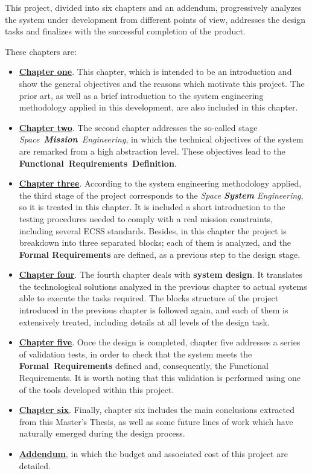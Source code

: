 This project, divided into six chapters and an addendum, progressively analyzes the system under development from different points of view, addresses the design tasks and finalizes with the successful completion of the product.

These chapters are:

\begin{itemize} [noitemsep,topsep=0pt]
\item \hyperref[chap:chapter1]{\textbf{Chapter one}}. This chapter, which is intended to be an introduction and show the general objectives and the reasons which motivate this project. The prior art, as well as a brief introduction to the system engineering methodology applied in this development, are also included in this chapter.

\item \hyperref[chap:chapter2]{\textbf{Chapter two}}. The second chapter addresses the so-called stage \textit{Space~\textbf{Mission}~Engineering}, in which the technical objectives of the system are remarked from a high abstraction level. These objectives lead to the \textbf{Functional~Requirements~Definition}.


\item \hyperref[chap:chapter3]{\textbf{Chapter three}}. According to the system engineering methodology applied, the third stage of the project corresponds to the \textit{Space \textbf{System} Engineering}, so it is treated in this chapter. It is included a short introduction to the testing procedures needed to comply with a real mission constraints, including several \acrshort{ECSS} standards. Besides, in this chapter the project is breakdown into three separated blocks; each of them is analyzed, and the \textbf{Formal Requirements} are defined, as a previous step to the design stage.

\item \hyperref[chap:chapter4]{\textbf{Chapter four}}. The fourth chapter deals with \textbf{system design}. It translates the technological solutions analyzed in the previous chapter to actual systems able to execute the tasks required. The blocks structure of the project introduced in the previous chapter is followed again, and each of them is extensively treated, including details at all levels of the design task.
\item \hyperref[chap:chapter5]{\textbf{Chapter five}}. Once the design is completed, chapter five addresses a series of validation tests, in order to check that the system meets the \textbf{Formal~Requirements} defined and, consequently, the Functional Requirements. It is worth noting that this validation is performed using one of the tools developed within this project.
\item \hyperref[chap:chapter6]{\textbf{Chapter six}}. Finally, chapter six includes the main conclusions extracted from this Master's Thesis, as well as some future lines of work which have naturally emerged during the design process.

\item \hyperref[cap:budget]{\textbf{Addendum}}, in which the budget and associated cost of this project are detailed.
\end{itemize}

